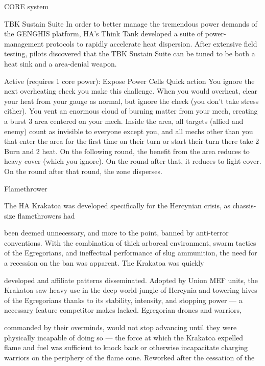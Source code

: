                                                CORE system

                                            TBK Sustain Suite
In order to better manage the tremendous power demands of the GENGHIS platform, HA’s Think Tank
developed a suite of power-management protocols to rapidly accelerate heat dispersion. After extensive
field testing, pilots discovered that the TBK Sustain Suite can be tuned to be both a heat sink and a
area-denial weapon.

Active (requires 1 core power): Expose Power Cells
Quick action
You ignore the next overheating check you make this challenge. When you would overheat, clear your
heat from your gauge as normal, but ignore the check (you don’t take stress either). You vent an
enormous cloud of burning matter from your mech, creating a burst 3 area centered on your mech.
Inside the area, all targets (allied and enemy) count as invisible to everyone except you, and all mechs
other than you that enter the area for the first time on their turn or start their turn there take 2 Burn and
2 heat.
On the following round, the benefit from the area reduces to heavy cover (which you ignore). On the
round after that, it reduces to light cover. On the round after that round, the zone disperses.




Flamethrower

The HA Krakatoa was developed specifically for the Hercynian crisis, as chassis-size flamethrowers had

been deemed unnecessary, and more to the point, banned by anti-terror conventions. With the
combination of thick arboreal environment, swarm tactics of the Egregorians, and ineffectual performance
of slug ammunition, the need for a recession on the ban was apparent. The Krakatoa was quickly

developed and affiliate patterns disseminated. Adopted by Union MEF units, the Krakatoa saw heavy use in
the deep world-jungle of Hercynia and towering hives of the Egregorians thanks to its stability, intensity,
and stopping power — a necessary feature competitor makes lacked. Egregorian drones and warriors,

commanded by their overminds, would not stop advancing until they were physically incapable of doing so
— the force at which the Krakatoa expelled flame and fuel was sufficient to knock back or otherwise
incapacitate charging warriors on the periphery of the flame cone. Reworked after the cessation of the

